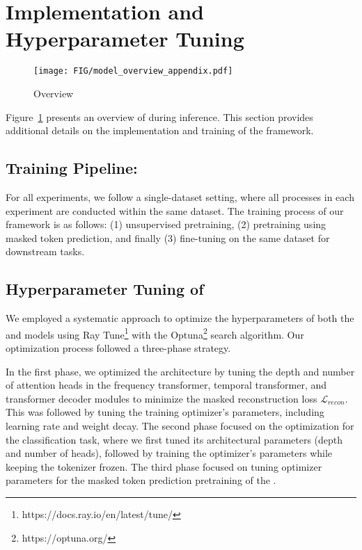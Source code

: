 




\section{\method Implementation and Hyperparameter Tuning}
\label{app:tfmtoken_hyperparams}

\begin{figure}[thpb]
    \centering
    \texttt{[image: FIG/model\_overview\_appendix.pdf]}
    \caption{\method Overview}
    \label{fig:model_overview_appendix}
\end{figure}

Figure~\ref{fig:model_overview_appendix} presents an overview of \method during inference. This section provides additional details on the implementation and training of the framework.

\subsection{Training Pipeline:} For all experiments, we follow a single-dataset setting, where all processes in each experiment are conducted within the same dataset. The training process of our framework is as follows: (1) \tokenizer unsupervised pretraining, (2) \encoder pretraining using masked token prediction, and finally (3) fine-tuning on the same dataset for downstream tasks.

\subsection{Hyperparameter Tuning of \method}
We employed a systematic approach to optimize the hyperparameters of both the \tokenizer and \encoder models using Ray Tune\footnote{https://docs.ray.io/en/latest/tune/} with the Optuna\footnote{https://optuna.org/}  search algorithm. Our optimization process followed a three-phase strategy. 

In the first phase, we optimized the \tokenizer architecture by tuning the depth and number of attention heads in the frequency transformer, temporal transformer, and transformer decoder modules to minimize the masked reconstruction loss $\mathcal{L}_{recon}$. This was followed by tuning the training optimizer's parameters, including learning rate and weight decay. The second phase focused on the \encoder optimization for the classification task, where we first tuned its architectural parameters (depth and number of heads), followed by training the optimizer's parameters while keeping the tokenizer frozen. The third phase focused on tuning optimizer parameters for the masked token prediction pretraining of the \encoder.

